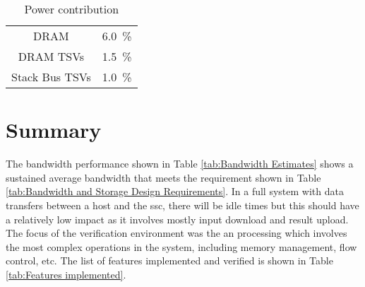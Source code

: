 \begin{table}[h]
\begin{subtable}{0.75\textwidth}
\begin{adjustbox}{width=0.55\textwidth}
\begin{tabular}{|c|c|}
                   DRAM  & \SI[per-mode=symbol]{ 6.0}{\percent}  \\
              DRAM TSVs  & \SI[per-mode=symbol]{ 1.5}{\percent}  \\
         Stack Bus TSVs  & \SI[per-mode=symbol]{ 1.0}{\percent}  \\
        \hline
      \end{tabular}
    \end{adjustbox}
    \vspace{3pt}
    \captionsetup{justification=centering, skip=10pt}
    \caption{Power contribution}
    \label{tab:Power Dissipation}
  \end{subtable}
  \end{table}


\section{Summary}
\label{sec:Results summary}

The bandwidth performance shown in Table \ref{tab:Bandwidth Estimates} shows a sustained average bandwidth that meets the requirement shown in Table \ref{tab:Bandwidth and Storage Design Requirements}.
In a full system with data transfers between a host and the \ac{ssc}, there will be idle times but this should have a relatively low impact as it involves mostly input download and result upload.
The focus of the verification environment was the \ac{an} processing which involves the most complex operations in the system, including memory management, flow control, etc.
The list of features implemented and verified is shown in Table \ref{tab:Features implemented}.

